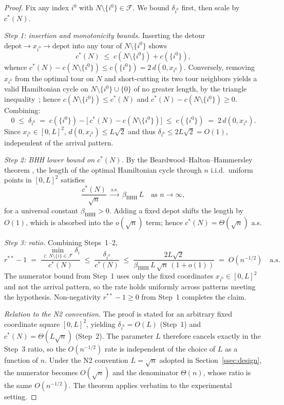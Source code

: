 \documentclass[11pt]{article}
\theoremstyle{plain}
\theoremstyle{definition}
\theoremstyle{remark}
\newcommand{\F}{\mathcal{F}}
\newcommand{\cstar}{c^{\ast}}
\begin{document}
\begin{proof}
Fix any index $i^{0}$ with $N\setminus\{i^{0}\}\in\F$. We bound $\delta_{i^{0}}$ first, then scale by $\cstar(N)$.

\emph{Step 1: insertion and monotonicity bounds.}
Inserting the detour $\text{depot}\to x_{i^{0}}\to\text{depot}$ into any tour of $N\setminus\{i^{0}\}$ shows
\begin{equation}\label{eq:insert}
\cstar(N) \;\le\; c(N\setminus\{i^{0}\}) + c(\{i^{0}\}),
\end{equation}
whence $\cstar(N) - c(N\setminus\{i^{0}\}) \le c(\{i^{0}\}) = 2\,d(0,x_{i^{0}})$.
Conversely, removing $x_{i^{0}}$ from the optimal tour on $N$ and short-cutting its two tour neighbors yields a valid Hamiltonian cycle on $N\setminus\{i^{0}\}\cup\{0\}$ of no greater length, by the triangle inequality~\citep[\S 2.1]{steele1997probability}; hence $c(N\setminus\{i^{0}\}) \le \cstar(N)$ and $\cstar(N) - c(N\setminus\{i^{0}\}) \ge 0$. Combining:
\[
0 \;\le\; \delta_{i^{0}} \;=\; c(\{i^{0}\}) - \bigl[\,\cstar(N) - c(N\setminus\{i^{0}\})\bigr] \;\le\; c(\{i^{0}\}) \;=\; 2\,d(0,x_{i^{0}}).
\]
Since $x_{i^{0}}\in[0,L]^2$, $d(0,x_{i^{0}})\le L\sqrt{2}$ and thus $\delta_{i^{0}} \le 2L\sqrt{2} = O(1)$, independent of the arrival pattern.

\emph{Step 2: BHH lower bound on $\cstar(N)$.} By the Beardwood--Halton--Hammersley theorem \citep{beardwood1959shortest,steele1981subadditive}, the length of the optimal Hamiltonian cycle through $n$ i.i.d.\ uniform points in $[0,L]^2$ satisfies
\[
\frac{\cstar(N)}{\sqrt{n}} \;\xrightarrow{\text{a.s.}}\; \beta_{\mathrm{BHH}}\,L \quad \text{as } n\to\infty,
\]
for a universal constant $\beta_{\mathrm{BHH}}>0$. Adding a fixed depot shifts the length by $O(1)$, which is absorbed into the $o(\sqrt{n})$ term; hence $\cstar(N) = \Theta(\sqrt{n})$ a.s.

\emph{Step 3: ratio.} Combining Steps~1--2,
\[
r^{\ast\ast}-1 \;=\; \frac{\min_{\,i:\,N\setminus\{i\}\in\F}\delta_i}{\cstar(N)} \;\le\; \frac{\delta_{i^{0}}}{\cstar(N)} \;\le\; \frac{2L\sqrt{2}}{\beta_{\mathrm{BHH}}\,L\,\sqrt{n}\,(1+o(1))} \;=\; O(n^{-1/2}) \quad\text{a.s.}
\]
The numerator bound from Step~1 uses only the fixed coordinates $x_{i^{0}}\in[0,L]^2$ and not the arrival pattern, so the rate holds uniformly across patterns meeting the hypothesis. Non-negativity $r^{\ast\ast}-1\ge 0$ from Step~1 completes the claim.

\emph{Relation to the N2 convention.} The proof is stated for an arbitrary fixed coordinate square $[0,L]^2$, yielding $\delta_{i^{0}}=O(L)$ (Step~1) and $\cstar(N)=\Theta(L\sqrt{n})$ (Step~2). The parameter $L$ therefore cancels exactly in the Step~3 ratio, so the $O(n^{-1/2})$ rate is independent of the choice of $L$ as a function of $n$. Under the N2 convention $L=\sqrt{n}$ adopted in Section~\ref{ssec:design}, the numerator becomes $O(\sqrt{n})$ and the denominator $\Theta(n)$, whose ratio is the same $O(n^{-1/2})$. The theorem applies verbatim to the experimental setting.
\end{proof}
\end{document}
